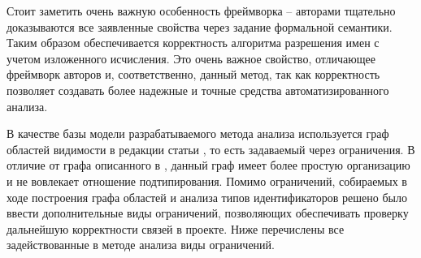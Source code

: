 Стоит заметить очень важную особенность фреймворка -- авторами тщательно доказываются все заявленные свойства
через задание формальной семантики. Таким образом обеспечивается корректность алгоритма разрешения имен с учетом
изложенного исчисления. Это очень важное свойство, отличающее фреймворк авторов и, соответственно, данный метод,
так как корректность позволяет создавать более надежные и точные средства автоматизированного анализа.

В качестве базы модели разрабатываемого метода анализа используется граф областей видимости в редакции статьи \cite{scope-graphs-static-analysis}
, то есть задаваемый через ограничения. В отличие от графа описанного в \cite{scope-graphs-typed},
данный граф имеет более простую организацию и не вовлекает отношение подтипирования. Помимо ограничений, собираемых
в ходе построения графа областей и анализа типов идентификаторов решено было ввести дополнительные виды ограничений,
позволяющих обеспечивать проверку дальнейшую корректности связей в проекте. Ниже перечислены все задействованные
в методе анализа виды ограничений.
